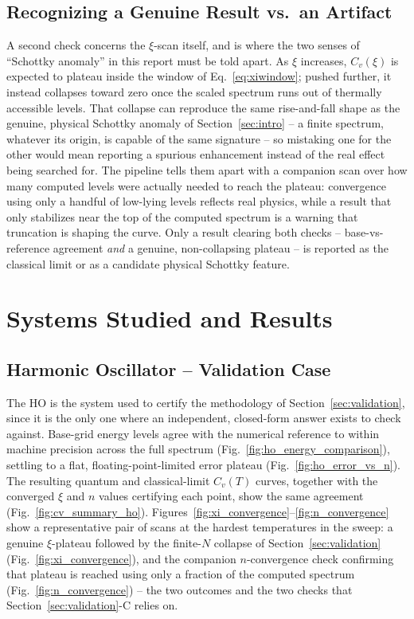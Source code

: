 \documentclass[10pt,conference]{IEEEtran}
\begin{document}
\subsection{Recognizing a Genuine Result vs.\ an Artifact}
A second check concerns the $\xi$-scan itself, and is where the two senses of ``Schottky anomaly'' in this report must be told apart. As $\xi$ increases, $C_v(\xi)$ is expected to plateau inside the window of Eq.~\eqref{eq:xiwindow}; pushed further, it instead collapses toward zero once the scaled spectrum runs out of thermally accessible levels. That collapse can reproduce the same rise-and-fall shape as the genuine, physical Schottky anomaly of Section~\ref{sec:intro} -- a finite spectrum, whatever its origin, is capable of the same signature -- so mistaking one for the other would mean reporting a spurious enhancement instead of the real effect being searched for. The pipeline tells them apart with a companion scan over how many computed levels were actually needed to reach the plateau: convergence using only a handful of low-lying levels reflects real physics, while a result that only stabilizes near the top of the computed spectrum is a warning that truncation is shaping the curve. Only a result clearing both checks -- base-vs-reference agreement \emph{and} a genuine, non-collapsing plateau -- is reported as the classical limit or as a candidate physical Schottky feature.

\section{Systems Studied and Results}
\label{sec:systems}

\subsection{Harmonic Oscillator -- Validation Case}
The HO is the system used to certify the methodology of Section~\ref{sec:validation}, since it is the only one where an independent, closed-form answer exists to check against. Base-grid energy levels agree with the numerical reference to within machine precision across the full spectrum (Fig.~\ref{fig:ho_energy_comparison}), settling to a flat, floating-point-limited error plateau (Fig.~\ref{fig:ho_error_vs_n}). The resulting quantum and classical-limit $C_v(T)$ curves, together with the converged $\xi$ and $n$ values certifying each point, show the same agreement (Fig.~\ref{fig:cv_summary_ho}). Figures~\ref{fig:xi_convergence}--\ref{fig:n_convergence} show a representative pair of scans at the hardest temperatures in the sweep: a genuine $\xi$-plateau followed by the finite-$N$ collapse of Section~\ref{sec:validation} (Fig.~\ref{fig:xi_convergence}), and the companion $n$-convergence check confirming that plateau is reached using only a fraction of the computed spectrum (Fig.~\ref{fig:n_convergence}) -- the two outcomes and the two checks that Section~\ref{sec:validation}-C relies on.
\end{document}
